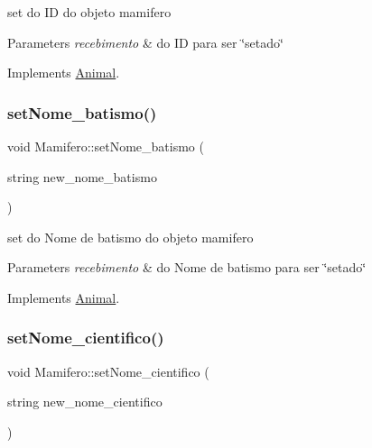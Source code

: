 set do ID do objeto mamifero 


\begin{DoxyParams}{Parameters}
{\em recebimento} & do ID para ser \char`\"{}setado\char`\"{} \\
\hline
\end{DoxyParams}


Implements \mbox{\hyperlink{class_animal}{Animal}}.

\mbox{\label{class_mamifero_a884f25c24051f7c8a5c4e6227317308a}} 
\subsubsection{\texorpdfstring{setNome\_batismo()}{setNome\_batismo()}}
{\footnotesize\ttfamily void Mamifero\+::set\+Nome\+\_\+batismo (\begin{DoxyParamCaption}\item[{string}]{new\+\_\+nome\+\_\+batismo }\end{DoxyParamCaption})\hspace{0.3cm}{\ttfamily [virtual]}}



set do Nome de batismo do objeto mamifero 


\begin{DoxyParams}{Parameters}
{\em recebimento} & do Nome de batismo para ser \char`\"{}setado\char`\"{} \\
\hline
\end{DoxyParams}


Implements \mbox{\hyperlink{class_animal}{Animal}}.

\mbox{\label{class_mamifero_a5d3a36f1a5d26bde0b55b64ff79c4aaf}} 
\subsubsection{\texorpdfstring{setNome\_cientifico()}{setNome\_cientifico()}}
{\footnotesize\ttfamily void Mamifero\+::set\+Nome\+\_\+cientifico (\begin{DoxyParamCaption}\item[{string}]{new\+\_\+nome\+\_\+cientifico }\end{DoxyParamCaption})\hspace{0.3cm}{\ttfamily [virtual]}}



